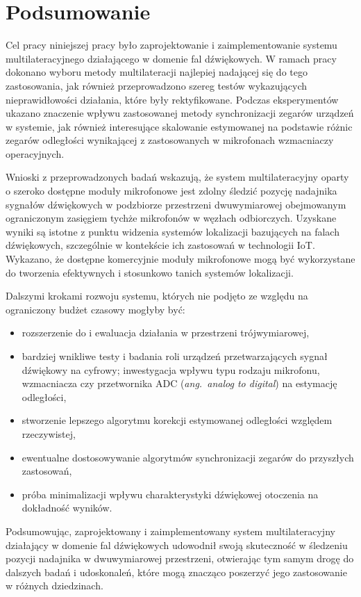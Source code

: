 \chapter*{Podsumowanie}\label{chap:podsumowanie}

Cel pracy niniejszej pracy było zaprojektowanie i zaimplementowanie systemu multilateracyjnego działającego w domenie fal dźwiękowych. W ramach pracy dokonano wyboru metody multilateracji najlepiej nadającej się do tego zastosowania, jak również przeprowadzono szereg testów wykazujących nieprawidłowości działania, które były rektyfikowane. Podczas eksperymentów ukazano znaczenie wpływu zastosowanej metody synchronizacji zegarów urządzeń w systemie, jak również interesujące skalowanie estymowanej na podstawie różnic zegarów odległości wynikającej z zastosowanych w mikrofonach wzmacniaczy operacyjnych.

Wnioski z przeprowadzonych badań wskazują, że system multilateracyjny oparty o szeroko dostępne moduły mikrofonowe jest zdolny śledzić pozycję nadajnika sygnałów dźwiękowych w podzbiorze przestrzeni dwuwymiarowej obejmowanym ograniczonym zasięgiem tychże mikrofonów w węzłach odbiorczych. Uzyskane wyniki są istotne z punktu widzenia systemów lokalizacji bazujących na falach dźwiękowych, szczególnie w kontekście ich zastosowań w technologii IoT. Wykazano, że dostępne komercyjnie moduły mikrofonowe mogą być wykorzystane do tworzenia efektywnych i stosunkowo tanich systemów lokalizacji.

Dalszymi krokami rozwoju systemu, których nie podjęto ze względu na ograniczony budżet czasowy mogłyby być:

\begin{itemize}
    \item rozszerzenie do i ewaluacja działania w przestrzeni trójwymiarowej,
    \item bardziej wnikliwe testy i badania roli urządzeń przetwarzających sygnał dźwiękowy na cyfrowy; inwestygacja wpływu typu rodzaju mikrofonu, wzmacniacza czy przetwornika ADC (\textit{ang.\ analog to digital}) na estymację odległości,
    \item stworzenie lepszego algorytmu korekcji estymowanej odległości względem rzeczywistej,
    \item ewentualne dostosowywanie algorytmów synchronizacji zegarów do przyszłych zastosowań,
    \item próba minimalizacji wpływu charakterystyki dźwiękowej otoczenia na dokładność wyników.
\end{itemize}

Podsumowując, zaprojektowany i zaimplementowany system multilateracyjny działający w domenie fal dźwiękowych udowodnił swoją skuteczność w śledzeniu pozycji nadajnika w dwuwymiarowej przestrzeni, otwierając tym samym drogę do dalszych badań i udoskonaleń, które mogą znacząco poszerzyć jego zastosowanie w różnych dziedzinach.